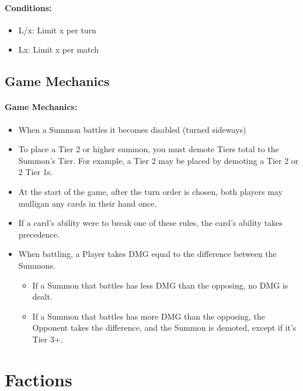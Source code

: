 \documentclass[12pt, letterpaper]{article}
\begin{document}
\paragraph{Conditions:}
\begin{itemize}
    \item L/x: Limit x per turn
    \item Lx: Limit x per match
\end{itemize}
\newpage
\subsection{Game Mechanics}
\paragraph{Game Mechanics: \\}
\begin{itemize}
    \item When a Summon battles it becomes disabled (turned sideways)
    \item To place a Tier 2 or higher summon, you must demote Tiers total to the Summon's Tier. 
    For example, a Tier 2 may be placed by demoting a Tier 2 or 2 Tier 1s.
    \item At the start of the game, after the turn order is chosen, both players may mulligan any cards in their hand once.
    \item If a card’s ability were to break one of these rules, the card's ability takes precedence.
    \item When battling, a Player takes DMG equal to the difference between the Summons. 
    \begin{itemize}
        \item If a Summon that battles has less DMG than the opposing, no DMG is dealt.
        \item If a Summon that battles has more DMG than the opposing, the Opponent takes the difference, 
        and the Summon is demoted, except if it's Tier 3+. 
    \end{itemize} 
\end{itemize}
\newpage

\newpage

\newpage

\newpage

\newpage


\section{Factions}
\end{document}
